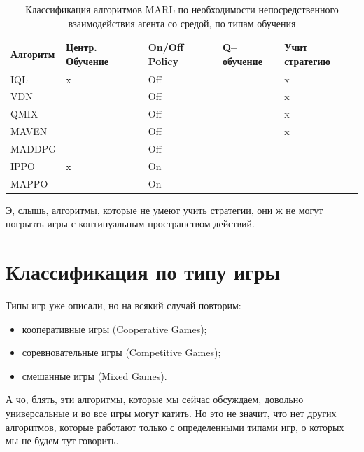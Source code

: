 \begin{table}[H]
	\centering
	\caption{Классификация алгоритмов MARL по необходимости непосредственного взаимодействия агента со средой, по типам обучения}
	\label{classification}
	\begin{tabular}{@{}|l|l|l|l|l|@{}}
	\toprule
	Алгоритм & Центр. Обучение & On/Off Policy & Q--обучение     & Учит стратегию \\ \midrule
	IQL      & x          	   & Off           & \checkmark     & x             \\
	VDN      & \checkmark      & Off           & \checkmark     & x              \\
	QMIX     & \checkmark      & Off           & \checkmark     & x              \\
	MAVEN    & \checkmark      & Off           & \checkmark     & x              \\
	MADDPG   & \checkmark      & Off           & \checkmark     & \checkmark     \\
	IPPO     & x  		       & On            & \checkmark     & \checkmark     \\
	MAPPO    & \checkmark      & On            & \checkmark     & \checkmark     \\
	\bottomrule
	\end{tabular}
\end{table}
Э, слышь, алгоритмы, которые не умеют учить стратегии, они ж не могут погрызть игры с континуальным пространством действий.

\section{Классификация по типу игры}

Типы игр уже описали, но на всякий случай повторим:
\begin{itemize}[label=---]
\item кооперативные игры (Cooperative Games);
\item соревновательные игры (Competitive Games);
\item смешанные игры (Mixed Games).
\end{itemize}

А чо, блять, эти алгоритмы, которые мы сейчас обсуждаем, довольно универсальные и во все игры могут катить. Но это не значит, что нет других алгоритмов, которые работают только с определенными типами игр, о которых мы не будем тут говорить.

